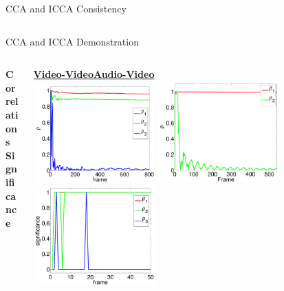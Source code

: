 \documentclass[8pt]{beamer}
\begin{document}
\begin{frame}{CCA and ICCA Consistency}
\begin{columns}[T]
\begin{column}{1\textwidth}
  \end{column}
  \end{columns}



\end{frame}

\begin{frame}{CCA and ICCA Demonstration}

  \begin{columns}[T]
  \begin{column}{0.01\textwidth}
    \vspace{15ex}
    \textbf{Correlations}\\
    \vspace{20ex}
    \textbf{Significance}
  \end{column}
  \begin{column}{1\textwidth}
    \begin{center}
      \href{run:/home/user/Documents/thesis_vids/flashing_video2.mp4}{\textbf{Video-Video}}\hspace{20ex}\href{run:/home/user/Documents/thesis_vids/av_coffee_pres.mp4}{\textbf{Audio-Video}}\\
        \includegraphics[width=0.38\textwidth]{figures/flashing_icca_corrs.pdf}
        \hspace{2ex}
        \includegraphics[width=0.38\textwidth]{figures/av_icca_corrs.pdf}\\[2ex]
        \includegraphics[width=0.38\textwidth]{figures/flashing_icca_sig_zoom.pdf}

\end{center}
\end{column}
\end{columns}
\end{frame}
\end{document}
